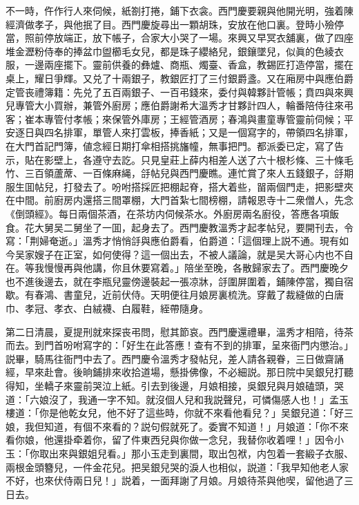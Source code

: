 不一時，仵作行人來伺候，紙劄打捲，鋪下衣衾。西門慶要親與他開光明，強着陳經濟做孝子，與他抿了目。西門慶旋尋出一顆胡珠，安放在他口裏。登時小殮停當，照前停放端正，放下帳子，合家大小哭了一場。來興又早冥衣舖裏，做了四座堆金瀝粉侍奉的捧盆巾盥櫛毛女兒，都是珠子纓絡兒，銀鑲墜兒，似眞的色綾衣服，一邊兩座擺下。靈前供養的彝爐、商瓶、燭臺、香盒，教錫匠打造停當，擺在桌上，耀日爭輝。又兑了十兩銀子，教銀匠打了三付銀爵盞。又在廂房中與應伯爵定管丧禮簿籍：先兑了五百兩銀子、一百弔錢來，委付與韓夥計管帳；賁四與來興兒專管大小買辦，兼管外廚房；應伯爵謝希大溫秀才甘夥計四人，輪番陪侍往來弔客；崔本專管付孝帳；來保管外庫房；王經管酒房；春鴻與畫童專管靈前伺候；平安逐日與四名排軍，單管人來打雲板，捧香紙；又是一個寫字的，帶領四名排軍，在大門首記門簿，値念經日期打傘相搭挑旛幢，無事把門。都派委已定，寫了告示，貼在影壁上，各遵守去訖。只見皇莊上薛内相差人送了六十根杉條、三十條毛竹、三百領蘆蓆、一百條麻䋲，㧱帖兒與西門慶瞧。連忙賞了來人五錢銀子，㧱期服生囬帖兒，打發去了。吩咐搭採匠把棚起脊，搭大着些，㽞兩個門走，把影壁夾在中間。前廚房内還搭三間罩棚，大門首紮七間榜棚，請報恩寺十二衆僧人，先念《倒頭經》。每日兩個茶酒，在茶坊内伺候茶水。外廚房兩名廚役，答應各項飯食。花大舅吴二舅坐了一囬，起身去了。西門慶教溫秀才起孝帖兒，要開刊去，令寫：「荆婦奄逝。」溫秀才悄悄㧱與應伯爵看，伯爵道：「這個理上説不通。現有如今吴家嫂子在正室，如何使得？這一個出去，不被人議論，就是吴大哥心内也不自在。等我慢慢再與他講，你且休要寫着。」陪坐至晚，各散歸家去了。西門慶晚夕也不進後邊去，就在李瓶兒靈傍邊裝起一張凉牀，㧱圍屏圍着，鋪陳停當，獨自宿歇。有春鴻、書童兒，近前伏侍。天明便往月娘房裏梳洗。穿戴了裁縫做的白唐巾、孝冠、孝衣、白絨襪、白履鞋，絰帶隨身。

第二日清晨，夏提刑就來探丧弔問，慰其節哀。西門慶還禮畢，溫秀才相陪，待茶而去。到門首吩咐寫字的：「好生在此答應！查有不到的排軍，呈來衙門内懲治。」説畢，騎馬往衙門中去了。西門慶令溫秀才發帖兒，差人請各親眷，三日做齋誦經，早來赴會。後晌鋪排來收拾道場，懸掛佛像，不必細説。那日院中吴銀兒打聽得知，坐轎子來靈前哭泣上紙。引去到後邊，月娘相接，吳銀兒與月娘磕頭，哭道：「六娘沒了，我通一字不知。就沒個人兒和我説聲兒，可憐傷感人也！」孟玉樓道：「你是他乾女兒，他不好了這些時，你就不來看他看兒？」吴銀兒道：「好三娘，我但知道，有個不來看的？説句假就死了。委實不知道！」月娘道：「你不來看你娘，他還掛牵着你，留了件東西兒與你做一念兒，我替你收着哩！」因令小玉：「你取出來與銀姐兒看。」那小玉走到裏間，取出包袱，内包着一套緞子衣服、兩根金頭簪兒，一件金花兒。把吴銀兒哭的淚人也相似，説道：「我早知他老人家不好，也來伏侍兩日兒！」説着，一面拜謝了月娘。月娘待茶與他喫，留他過了三日去。

